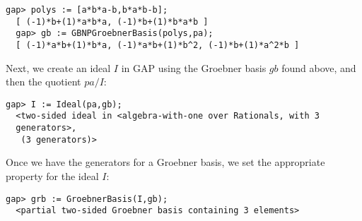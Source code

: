 \documentclass[a4paper,11pt]{report}
\begin{document}
{{\begin{Verbatim}[fontsize=\small,frame=single,label=Example]
  gap> polys := [a*b*a-b,b*a*b-b];
  [ (-1)*b+(1)*a*b*a, (-1)*b+(1)*b*a*b ]
  gap> gb := GBNPGroebnerBasis(polys,pa);
  [ (-1)*a*b+(1)*b*a, (-1)*a*b+(1)*b^2, (-1)*b+(1)*a^2*b ]
\end{Verbatim}
 Next, we create an ideal $I$ in \texttt{}\texttt{}GAP\texttt{} using the
Groebner basis $gb$ found above, and then the quotient $pa/I$: 
\begin{Verbatim}[fontsize=\small,frame=single,label=Example]
  gap> I := Ideal(pa,gb);
  <two-sided ideal in <algebra-with-one over Rationals, with 3
  generators>, 
   (3 generators)>
\end{Verbatim}
 Once we have the generators for a Groebner basis, we set the appropriate
property for the ideal $I$: 
\begin{Verbatim}[fontsize=\small,frame=single,label=Example]
  gap> grb := GroebnerBasis(I,gb);    
  <partial two-sided Groebner basis containing 3 elements>
\end{Verbatim}
 }

 
}
\end{document}
